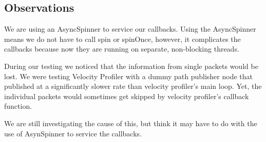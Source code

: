 \subsection{Observations}

We are using an AsyncSpinner to service our callbacks.  Using the
AsyncSpinner means we do not have to call spin or spinOnce, however,
it complicates the callbacks because now they are running on separate,
non-blocking threads.

During our testing we noticed that the information from single packets
would be lost.  We were testing Velocity Profiler with a dummy path
publisher node that published at a significantly slower rate than
velocity profiler's main loop.  Yet, the individual packets would
sometimes get skipped by velocity profiler's callback function.

We are still investigating the cause of this, but think it may have to
do with the use of AsynSpinner to service the callbacks.